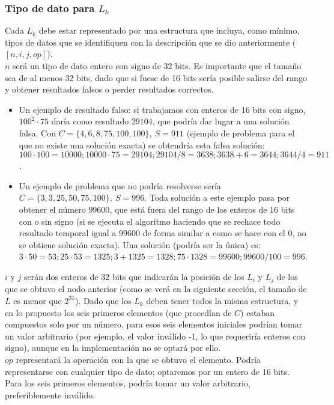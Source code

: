 \subsubsection{Tipo de dato para $L_k$}

Cada $L_k$ debe estar representado por una estructura que incluya, como
mínimo, tipos de datos que se identifiquen con la descripción que se dio
anteriormente ($[n, i, j, op]$).\\

$n$ será un tipo de dato entero con signo de 32 bits. Es importante
que el tamaño sea de al menos 32 bits, dado que si fuese de 16 bits sería posible
salirse del rango y obtener resultados falsos o perder resultados correctos.
\begin{itemize}
	\item Un ejemplo de resultado falso: si trabajamos con enteros de 16 bits con
	signo, $100^2 \cdot 75$ daría como resultado $29104$, que podría dar lugar a
	una solución falsa. Con $C=\{4, 6, 8, 75, 100, 100\},\ S = 911$ (ejemplo de
	problema para el que no existe una solución exacta) se obtendría esta falsa
	solución: $100 \cdot 100=10000; 10000 \cdot 75=29104;29104/8=3638;3638+6=3644;3644/4=911$.
	\item Un ejemplo de problema que no podría resolverse sería
	$C=\{3, 3, 25, 50, 75, 100\},\ S = 996$. Toda solución a este ejemplo pasa por
	obtener el número $99600$, que está fuera del rango de los enteros de 16 bits
	con o sin signo (si se ejecuta el algoritmo haciendo que se rechace todo
	resultado temporal igual a $99600$ de forma similar a como se hace con el
	$0$, no se obtiene solución exacta). Una solución (podría ser la única) es:
	$3 \cdot 50 = 53; 25 \cdot 53 = 1325; 3+1325=1328; 75 \cdot 1328 = 99600; 99600/100=996$.
\end{itemize}

$i$ y $j$ serán dos enteros de 32 bits que indicarán la posición de los $L_i$
y $L_j$ de los que se obtuvo el nodo anterior (como se verá en la siguiente sección, el tamaño de $L$ es menor que $2^{31}$). Dado que los $L_k$ deben tener
todos la misma estructura, y en lo propuesto los seis primeros elementos (que
procedían de $C$) estaban compuestos solo por un número, para esos seis
elementos iniciales podrían tomar un valor arbitrario (por ejemplo, el valor
inválido -1, lo que requeriría enteros con signo), aunque en la
implementación no se optará por ello. \\

$op$ representará la operación con la que se obtuvo el elemento.
Podría representarse con cualquier tipo de dato; optaremos por un entero
de 16 bits. Para los seis primeros elementos, podría tomar un valor
arbitrario, preferiblemente inválido.\\

